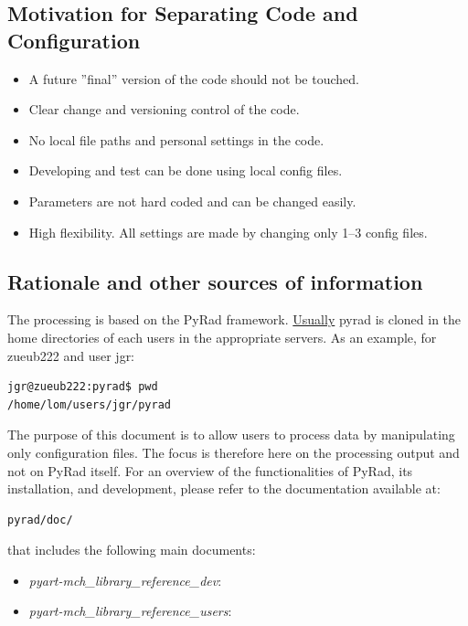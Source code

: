 \documentclass[a4paper,11pt,pdftex,twoside]{scrartcl}
\begin{document}
\subsection{Motivation for Separating Code and Configuration}
\begin{itemize}
  \item A future ''final'' version of the code should not be touched.
  \item Clear change and versioning control of the code.
  \item No local file paths and personal settings in the code.
  \item Developing and test can be done using local config files.
  \item Parameters are not hard coded and can be changed easily.
  \item High flexibility. All settings are made by changing only 1--3
    config files.
\end{itemize}

\subsection{Rationale and other sources of information}
The processing is based on the PyRad framework. \underline{Usually} pyrad is cloned in the home directories of each users in the appropriate servers. As an example, for zueub222 and user jgr:

\begin{verbatim}
jgr@zueub222:pyrad$ pwd
/home/lom/users/jgr/pyrad
\end{verbatim}

The purpose of this document is to allow users to process data by manipulating only configuration files. The focus is therefore here on the processing output and not on PyRad itself. For an overview of the functionalities of PyRad, its installation, and development, please refer to the documentation available at:

\begin{verbatim}
pyrad/doc/
\end{verbatim}

that includes the following main documents:
\begin{itemize}
   \item {\it pyart-mch\_library\_reference\_dev}:
   \item {\it pyart-mch\_library\_reference\_users}:
\end{itemize}

\newpage
\end{document}
